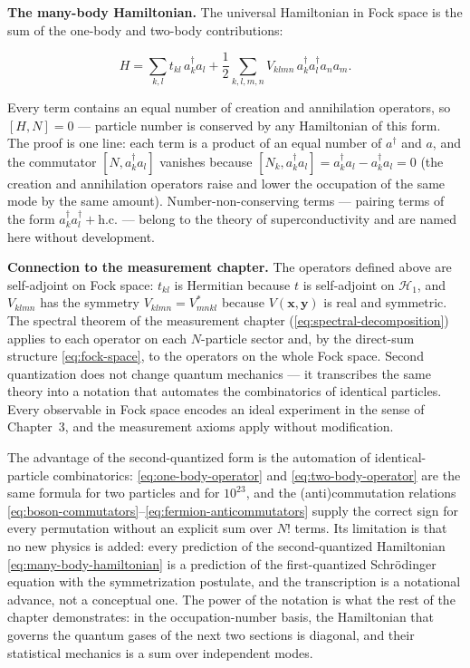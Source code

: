 \medskip\noindent\textbf{The many-body Hamiltonian.}
The universal Hamiltonian in Fock space is the sum of the one-body and two-body contributions:
\begin{linenomath}
    \begin{equation}
        H = \sum_{k,l} t_{kl}\,a_k^\dagger a_l
            + \frac{1}{2}\sum_{k,l,m,n} V_{klmn}\,a_k^\dagger a_l^\dagger a_n a_m.
        \label{eq:many-body-hamiltonian}
    \end{equation}
\end{linenomath}
Every term contains an equal number of creation and annihilation operators, so $[H, N] = 0$ --- particle number is conserved by any Hamiltonian of this form. The proof is one line: each term is a product of an equal number of $a^\dagger$ and $a$, and the commutator $[N, a_k^\dagger a_l]$ vanishes because $[N_k, a_k^\dagger a_l] = a_k^\dagger a_l - a_k^\dagger a_l = 0$ (the creation and annihilation operators raise and lower the occupation of the same mode by the same amount). Number-non-conserving terms --- pairing terms of the form $a_k^\dagger a_l^\dagger + \text{h.c.}$ --- belong to the theory of superconductivity and are named here without development.

\medskip\noindent\textbf{Connection to the measurement chapter.}
The operators defined above are self-adjoint on Fock space: $t_{kl}$ is Hermitian because $t$ is self-adjoint on $\mathcal{H}_1$, and $V_{klmn}$ has the symmetry $V_{klmn} = V_{mnkl}^*$ because $V(\bm x, \bm y)$ is real and symmetric. The spectral theorem of the measurement chapter (\eqref{eq:spectral-decomposition}) applies to each operator on each $N$-particle sector and, by the direct-sum structure \eqref{eq:fock-space}, to the operators on the whole Fock space. Second quantization does not change quantum mechanics --- it transcribes the same theory into a notation that automates the combinatorics of identical particles. Every observable in Fock space encodes an ideal experiment in the sense of Chapter~3, and the measurement axioms apply without modification.

The advantage of the second-quantized form is the automation of identical-particle combinatorics: \eqref{eq:one-body-operator} and \eqref{eq:two-body-operator} are the same formula for two particles and for $10^{23}$, and the (anti)commutation relations \eqref{eq:boson-commutators}--\eqref{eq:fermion-anticommutators} supply the correct sign for every permutation without an explicit sum over $N!$ terms. Its limitation is that no new physics is added: every prediction of the second-quantized Hamiltonian \eqref{eq:many-body-hamiltonian} is a prediction of the first-quantized Schr\"odinger equation with the symmetrization postulate, and the transcription is a notational advance, not a conceptual one. The power of the notation is what the rest of the chapter demonstrates: in the occupation-number basis, the Hamiltonian that governs the quantum gases of the next two sections is diagonal, and their statistical mechanics is a sum over independent modes.

